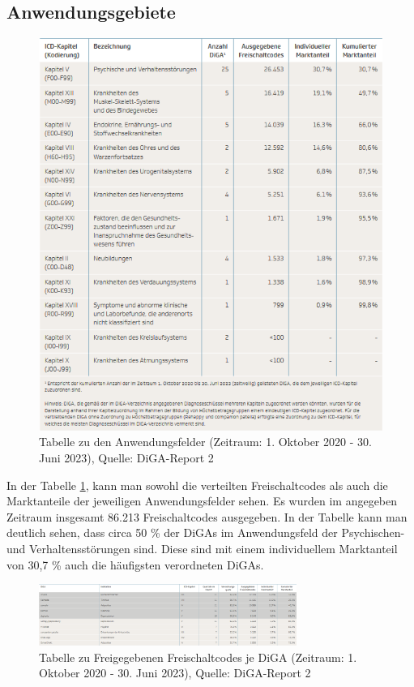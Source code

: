 \documentclass{article}
\begin{document}
		\subsection{Anwendungsgebiete}
			\begin{figure}[htbp]
				\centering
				\includegraphics[height=0.5\textheight]{./grafiken/tabelle_anwendungsfelder_diga}
				\caption[Anwendungsfelder der DiGA]{Tabelle zu den Anwendungsfelder (Zeitraum: 1. Oktober 2020 - 30. Juni 2023), Quelle: DiGA-Report 2 \cite{TK-Report-2}}
				\label{Tab-anwendungsfelder-diga}
			\end{figure}
			In der Tabelle \ref{Tab-anwendungsfelder-diga}, kann man sowohl die verteilten Freischaltcodes als auch die Marktanteile der jeweiligen Anwendungsfelder sehen. Es wurden im angegeben Zeitraum insgesamt 86.213 Freischaltcodes ausgegeben. In der Tabelle kann man deutlich sehen, dass circa 50 \% der DiGAs im Anwendungsfeld der Psychischen- und Verhaltensstörungen sind. Diese sind mit einem individuellem Marktanteil von 30,7 \% auch die häufigsten verordneten DiGAs.
			\newpage
			\begin{figure}[htbp]
				\centering
				\includegraphics[width=0.75\textwidth]{./grafiken/tab_diga_verteilung}
				\caption[Freigegebene Freischaltcode je DiGA]{Tabelle zu Freigegebenen Freischaltcodes je DiGA (Zeitraum: 1. Oktober 2020 - 30. Juni 2023), Quelle: DiGA-Report 2 \cite{TK-Report-2}}
				\label{Tab-freischaltcodes-je-diga}
			\end{figure}
\end{document}
